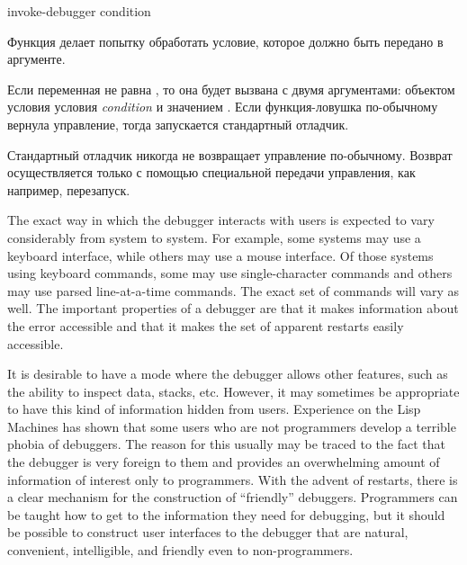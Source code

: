 \begin{defun}[Функция]
invoke-debugger condition

Функция делает попытку обработать условие, которое должно быть передано в аргументе.

Если переменная  не равна , то она будет вызвана с
двумя аргументами: объектом условия условия \emph{condition} и значением
. Если функция-ловушка по-обычному вернула управление,
тогда запускается стандартный отладчик.

Стандартный отладчик никогда не возвращает управление по-обычному. Возврат
осуществляется только с помощью специальной передачи управления, как например,
перезапуск.

\beforenoterule
\begin{sideremark} 
The exact way in which the debugger interacts with users is
expected to vary considerably from system to system. For example, some systems
may use a keyboard interface, while others may use a mouse interface. Of those
systems using keyboard commands, some may use single-character commands and
others may use parsed line-at-a-time commands. The exact set of commands will
vary as well. The important properties of a debugger are that it makes
information about the error accessible and that it makes the set of apparent
restarts easily accessible.

It is desirable to have a mode where the debugger allows other features, such as
the ability to inspect data, stacks, etc. However, it may sometimes be
appropriate to have this kind of information hidden from users. Experience on
the Lisp Machines has shown that some users who are not programmers develop a
terrible phobia of debuggers. The reason for this usually may be traced to the
fact that the debugger is very foreign to them and provides an overwhelming
amount of information of interest only to programmers. With the advent of
restarts, there is a clear mechanism for the construction of ``friendly''
debuggers. Programmers can be taught how to get to the information they need for
debugging, but it should be possible to construct user interfaces to the
debugger that are natural, convenient, intelligible, and friendly even to
non-programmers.
\end{sideremark}
\afternoterule
\end{defun}

